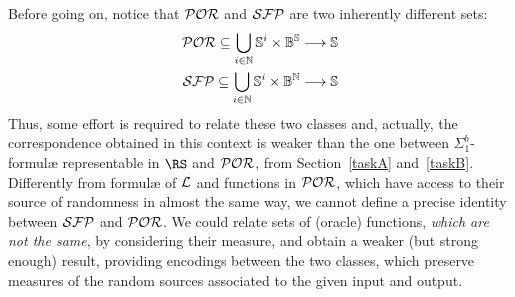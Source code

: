 































































Before going on, notice that $\mathcal{POR}$ and $\mathcal{SFP}$
are two inherently different sets:
\begin{align*}
\POR \subseteq \bigcup_{i\in \Nat} \Ss^i \times
\Bool^\Ss \map \Ss \\
%
\SFP \subseteq \bigcup_{i\in \Nat} \Ss^i \times
\Bool^\Nat \map \Ss
\end{align*}
%
Thus, some effort is required
to relate these two classes
%
and, actually, %
the correspondence obtained in this
context is weaker than the one between
$\Sigma^b_1$-formul\ae{} representable in
$\RS$ and $\mathcal{POR}$, from
Section~\ref{taskA} and~\ref{taskB}.
%
Differently from formul\ae{} of $\mathcal L$
and functions in $\mathcal{POR}$,
which have access to their source of randomness
in almost the same way,
we cannot define a precise identity between $\mathcal{SFP}$
and $\mathcal{POR}$.
%
We could relate sets of (oracle) functions,
\emph{which are not the same}, by considering
their measure,
and
obtain a weaker (but strong enough) result,
providing encodings between the two classes,
which preserve measures of the random sources
associated to the given input and output.



